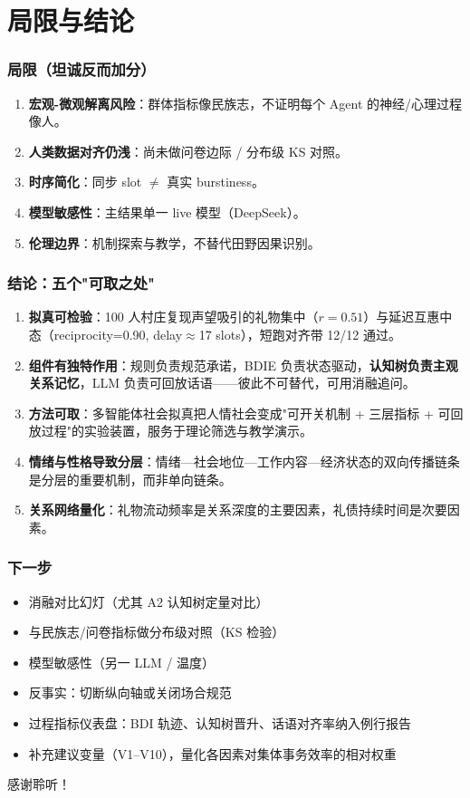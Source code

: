 \documentclass[AutoFakeBold,AutoFakeSlant]{beamer}
\begin{document}
\section{局限与结论}

\begin{frame}
    \frametitle{局限（坦诚反而加分）}
    \small
    \begin{enumerate}
        \item \textbf{宏观-微观解离风险}：群体指标像民族志，不证明每个 Agent 的神经/心理过程像人。
        \item \textbf{人类数据对齐仍浅}：尚未做问卷边际 / 分布级 KS 对照。
        \item \textbf{时序简化}：同步 slot $\neq$ 真实 burstiness。
        \item \textbf{模型敏感性}：主结果单一 live 模型（DeepSeek）。
        \item \textbf{伦理边界}：机制探索与教学，不替代田野因果识别。
    \end{enumerate}
\end{frame}

\begin{frame}
    \frametitle{结论：五个"可取之处"}
    \small
    \begin{enumerate}
        \item \textbf{拟真可检验}：100 人村庄复现声望吸引的礼物集中（$r=0.51$）与延迟互惠中态（reciprocity=0.90, delay$\approx$17 slots），短跑对齐带 12/12 通过。
        \item \textbf{组件有独特作用}：规则负责规范承诺，BDIE 负责状态驱动，\textbf{认知树负责主观关系记忆}，LLM 负责可回放话语——彼此不可替代，可用消融追问。
        \item \textbf{方法可取}：多智能体社会拟真把人情社会变成"可开关机制 + 三层指标 + 可回放过程"的实验装置，服务于理论筛选与教学演示。
        \item \textbf{情绪与性格导致分层}：情绪—社会地位—工作内容—经济状态的双向传播链条是分层的重要机制，而非单向链条。
        \item \textbf{关系网络量化}：礼物流动频率是关系深度的主要因素，礼债持续时间是次要因素。
    \end{enumerate}
\end{frame}

\begin{frame}
    \frametitle{下一步}
    \small
    \begin{itemize}
        \item 消融对比幻灯（尤其 A2 认知树定量对比）
        \item 与民族志/问卷指标做分布级对照（KS 检验）
        \item 模型敏感性（另一 LLM / 温度）
        \item 反事实：切断纵向轴或关闭场合规范
        \item 过程指标仪表盘：BDI 轨迹、认知树晋升、话语对齐率纳入例行报告
        \item 补充建议变量（V1--V10），量化各因素对集体事务效率的相对权重
    \end{itemize}
\end{frame}

\begin{frame}
    \begin{center}
        {\Huge 感谢聆听！}
    \end{center}
\end{frame}
\end{document}
